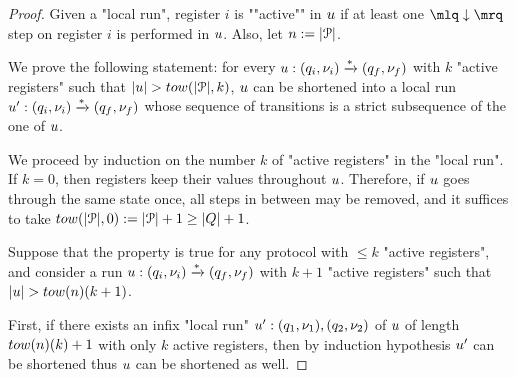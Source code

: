 \ifproofs
\begin{proof}

Given a "local run", register $i$ is ""active"" in $u$ if at least one $\quotemarks{\enregact}$ step on register $i$ is performed in $u$. Also, let $n:=|\mathcal{P}|$.

We prove the following statement:
for every $u: (q_i, \nu_i) \xrightarrow{*} (q_f, \nu_f)$ with $k$ "active registers" such that $\length{\localrun} > \towerfun(|\prot|,k)$, $u$ can be shortened into a local run $u': (q_i, \nu_i) \xrightarrow{*} (q_f, \nu_f)$ whose sequence of transitions is a strict subsequence of the one of $u$. 

We proceed by induction on the number $k$ of "active registers" in the "local run". If $k=0$, then registers keep their values throughout $u$. Therefore, if $u$ goes through the same state once, all steps in between may be removed, and it suffices to take $\towerfun(\size{\prot}, 0) := |\prot| + 1 \geq |Q| +1$.  

Suppose that the property is true for any protocol with $\leq k$ "active registers", and consider a run $u: (q_i,\nu_i) \xrightarrow{*} (q_f,\nu_f)$ with $k+1$ "active registers" such that $\length{\localrun} > \towerfun(n)(k+1)$.

First, if there exists an infix "local run" $u': (q_1, \nu_1), (q_2, \nu_2)$ of $u$ of length $\towerfun(n)(k)+1$ with only $k$ active registers, then by induction hypothesis $u'$ can be shortened thus $u$ can be shortened as well.


\end{proof}
